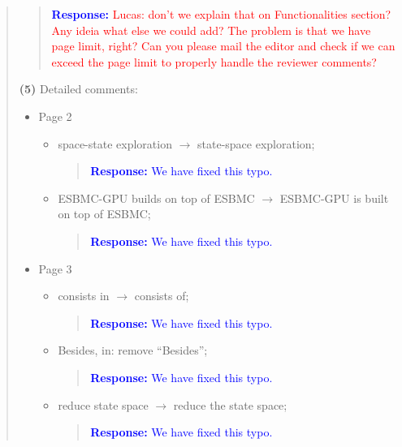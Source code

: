 \documentclass[11pt]{article}
\begin{document}
\begin{quote}
\begin{quote}
\textcolor{blue}{\textbf{Response:} \textcolor{red}{Lucas: don't we explain that on Functionalities section? Any ideia what else we could add? The problem is that we have page limit, right? Can you please mail the editor and check if we can exceed the page limit to properly handle the reviewer comments?}}
\end{quote}

{\bf (5)} Detailed comments:
\begin{itemize}
\item Page 2
  \begin{itemize}
  \item space-state exploration $\rightarrow$ state-space exploration;
  
    \begin{quote}
    \textcolor{blue}{\textbf{Response:} We have fixed this typo.}
    \end{quote}

  \item ESBMC-GPU builds on top of ESBMC $\rightarrow$ ESBMC-GPU is built on top of ESBMC;
  
    \begin{quote}
    \textcolor{blue}{\textbf{Response:} We have fixed this typo.}
    \end{quote}

  \end{itemize}
\item Page 3
  \begin{itemize}
  \item consists in $\rightarrow$ consists of;
  
    \begin{quote}
    \textcolor{blue}{\textbf{Response:} We have fixed this typo.}
    \end{quote}

  \item Besides, in: remove ``Besides'';
  
    \begin{quote}
    \textcolor{blue}{\textbf{Response:} We have fixed this typo.}
    \end{quote}

  \item reduce state space $\rightarrow$ reduce the state space;
  
    \begin{quote}
    \textcolor{blue}{\textbf{Response:} We have fixed this typo.}
    \end{quote}


\end{itemize}
\end{itemize}
\end{quote}
\end{document}
